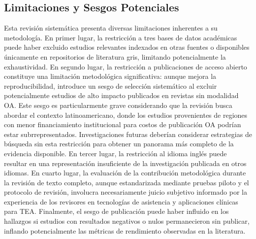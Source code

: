 \documentclass[3p,twocolumn,times]{elsarticle}
\begin{document}
	\subsection{Limitaciones y Sesgos Potenciales}\label{sec2h}
	
	Esta revisión sistemática presenta diversas limitaciones inherentes a su
	metodología. En primer lugar, la restricción a tres bases de datos académicas
	puede haber excluido estudios relevantes indexados en otras fuentes o disponibles
	únicamente en repositorios de literatura gris, limitando potencialmente la
	exhaustividad. En segundo lugar, la restricción a publicaciones de acceso abierto
	constituye una limitación metodológica significativa: aunque mejora la
	reproducibilidad, introduce un sesgo de selección sistemático al excluir
	potencialmente estudios de alto impacto publicados en revistas sin modalidad OA.
	Este sesgo es particularmente grave considerando que la revisión busca abordar el
	contexto latinoamericano, donde los estudios provenientes de regiones con menor
	financiamiento institucional para costos de publicación OA podrían estar
	subrrepresentados. Investigaciones futuras deberían considerar estrategias de
	búsqueda sin esta restricción para obtener un panorama más completo de la evidencia
	disponible. En tercer lugar, la restricción al idioma inglés puede resultar en una
	representación insuficiente de la investigación publicada en otros idiomas. En
	cuarto lugar, la evaluación de la contribución metodológica durante la revisión de
	texto completo, aunque estandarizada mediante pruebas piloto y el protocolo de
	revisión, involucra necesariamente juicio subjetivo informado por la experiencia
	de los revisores en tecnologías de asistencia y aplicaciones clínicas para TEA.
	Finalmente, el sesgo de publicación puede haber influido en los hallazgos si
	estudios con resultados negativos o nulos permanecieron sin publicar, inflando
	potencialmente las métricas de rendimiento observadas en la literatura.
	
\end{document}
